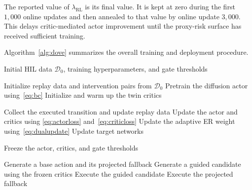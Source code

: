 \documentclass[9pt,journal]{IEEEtran}
\newcommand{\DOVE}{DOVE}
\newcommand{\CPCal}{\ensuremath{\mathrm{CPCal}}}
\newcommand{\D}{\mathcal{D}}
\newcommand{\ER}{\ensuremath{\mathrm{ER}}}
\newcommand{\va}{\bm{a}}
\newcommand{\vs}{\bm{s}}
\newcommand{\vah}{\ensuremath{\va_{\mathrm h}}}      %
\newcommand{\van}{\ensuremath{\va_{\mathrm n}}}      %
\begin{document}
The reported value of $\lambda_{\mathrm{RL}}$ is its final value. It is
kept at zero during the first $1{,}000$ online updates and then annealed
to that value by online update $3{,}000$. This delays critic-mediated
actor improvement until the proxy-risk surface has received sufficient
training.


Algorithm~\ref{alg:dove} summarizes the overall
training and deployment procedure.
\begin{algorithm}[!t]
\caption{\DOVE{} Training and Deployment}
\label{alg:dove}
\begin{algorithmic}[1]
\Require Initial HIL data $\D_0$, training hyperparameters,
and gate thresholds

\State Initialize replay data and intervention pairs from $\D_0$
\State Pretrain the diffusion actor using~\eqref{eq:bc}
\State Initialize and warm up the twin critics

    \State Collect the executed transition and update replay data
    \State Update the actor and critics using
    \eqref{eq:actorloss} and~\eqref{eq:criticloss}
    \State Update the adaptive ER weight using~\eqref{eq:dualupdate}
    \State Update target networks
\EndFor

\State Freeze the actor, critics, and gate thresholds

    \State Generate a base action and its projected fallback
    \State Generate a guided candidate using the frozen critics
        \State Execute the guided candidate
    \Else
        \State Execute the projected fallback
    \EndIf
\EndFor

\end{algorithmic}
\end{algorithm}



\end{document}
